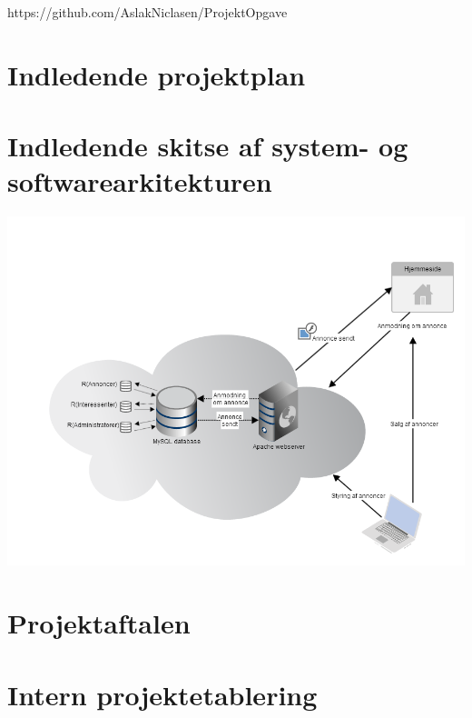 \documentclass[a4paper,12pt]{article}
\begin{document}
https://github.com/AslakNiclasen/ProjektOpgave

\section{Indledende projektplan}

\section{Indledende skitse af system- og softwarearkitekturen}

\includegraphics[width=\textwidth,height=\textheight,keepaspectratio]{architecture_diagram.png}

\section{Projektaftalen}

\section{Intern projektetablering}
\end{document}
